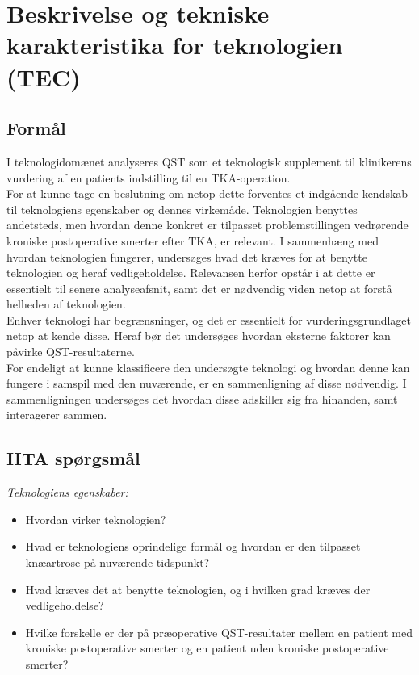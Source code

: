 \section{Beskrivelse og tekniske karakteristika for teknologien (TEC)}


\subsection{Formål}
I teknologidomænet analyseres QST som et teknologisk supplement til klinikerens vurdering af en patients indstilling til en TKA-operation. \\
For at kunne tage en beslutning om netop dette forventes et indgående kendskab til teknologiens egenskaber og dennes virkemåde. Teknologien benyttes andetsteds, men hvordan denne konkret er tilpasset problemstillingen vedrørende kroniske postoperative smerter efter TKA, er relevant. I sammenhæng med hvordan teknologien fungerer, undersøges hvad det kræves for at benytte teknologien og heraf vedligeholdelse. Relevansen herfor opstår i at dette er essentielt til senere analyseafsnit, samt det er nødvendig viden netop at forstå helheden af teknologien.\\
Enhver teknologi har begrænsninger, og det er essentielt for vurderingsgrundlaget netop at kende disse. Heraf bør det undersøges hvordan eksterne faktorer kan påvirke QST-resultaterne. \\
For endeligt at kunne klassificere den undersøgte teknologi og hvordan denne kan fungere i samspil med den nuværende, er en sammenligning af disse nødvendig. I sammenligningen undersøges det hvordan disse adskiller sig fra hinanden, samt interagerer sammen. %
\subsection{HTA spørgsmål}
\textit{Teknologiens egenskaber:}

\begin{itemize}
\item Hvordan virker teknologien?  %
\item Hvad er teknologiens oprindelige formål og hvordan er den tilpasset knæartrose på nuværende tidspunkt? %
\item Hvad kræves det at benytte teknologien, og i hvilken grad kræves der vedligeholdelse? %
\item Hvilke forskelle er der på præoperative QST-resultater mellem en patient med kroniske postoperative smerter og en patient uden kroniske postoperative smerter? %
\end{itemize}

